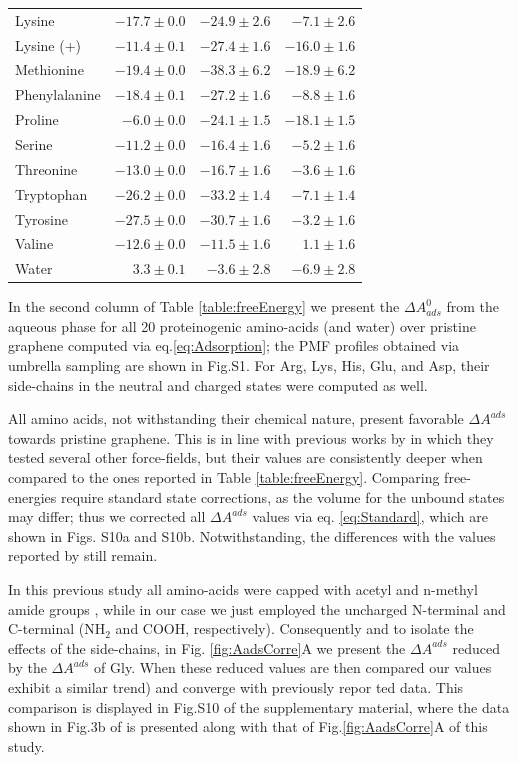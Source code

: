 \documentclass[journal=jcisd8,manuscript=article,layout=twocolumn]{achemso}
\begin{document}
\begin{table}[htbp!]
{\begin{tabular}{lrrr}
Lysine            & $-17.7 \pm 0.0$ & $-24.9 \pm 2.6$  & $-7.1  \pm 2.6$  \\
Lysine (+)        & $-11.4 \pm 0.1$ & $-27.4 \pm 1.6$  & $-16.0 \pm 1.6$  \\
Methionine        & $-19.4 \pm 0.0$ & $-38.3 \pm 6.2$  & $-18.9 \pm 6.2$  \\
Phenylalanine     & $-18.4 \pm 0.1$ & $-27.2 \pm 1.6$  & $-8.8  \pm 1.6$  \\
Proline           & $-6.0  \pm 0.0$ & $-24.1 \pm 1.5$  & $-18.1 \pm 1.5$  \\
Serine            & $-11.2 \pm 0.0$ & $-16.4 \pm 1.6$  & $-5.2  \pm 1.6$  \\
Threonine         & $-13.0 \pm 0.0$ & $-16.7 \pm 1.6$  & $-3.6  \pm 1.6$  \\
Tryptophan        & $-26.2 \pm 0.0$ & $-33.2 \pm 1.4$  & $-7.1  \pm 1.4$  \\
Tyrosine          & $-27.5 \pm 0.0$ & $-30.7 \pm 1.6$  & $-3.2  \pm 1.6$  \\
Valine            & $-12.6 \pm 0.0$ & $-11.5 \pm 1.6$  & $1.1   \pm 1.6$  \\
Water             & $3.3   \pm 0.1$ & $-3.6  \pm 2.8$  & $-6.9  \pm 2.8$  \\
\bottomrule
\end{tabular}
}
\end{table}

In the second column of Table \ref{table:freeEnergy} we present the $\Delta A_{ads}^0$ from the aqueous phase for all 20 proteinogenic amino-acids (and water) over pristine graphene computed via eq.\ref{eq:Adsorption}; the PMF profiles obtained via umbrella sampling are shown in Fig.S1. For Arg, Lys, His, Glu, and Asp, their side-chains in the neutral and charged states were computed as well.

All amino acids, not withstanding their chemical nature, present favorable $\Delta A^{ads}$ towards pristine graphene. This is in line with previous works by \citet{Dasetty2019} in which they tested several other force-fields, but their values are consistently deeper when compared to the ones reported in Table \ref{table:freeEnergy}.
Comparing free-energies require standard state corrections, as the volume for the unbound states may differ; thus  we corrected all $\Delta A^{ads}$ values  via eq. \eqref{eq:Standard}, which are shown in Figs. S10a and S10b. Notwithstanding, the differences with the values reported by \citet{Dasetty2019} still remain.

In this previous study all amino-acids were capped with acetyl and n-methyl amide groups \cite{Dasetty2019}, while in our case we just employed the uncharged N-terminal and C-terminal (NH$_2$ and COOH, respectively).
Consequently and to isolate the effects of the side-chains, in Fig. \ref{fig:AadsCorre}A we present the $\Delta A^{ads}$ reduced by the $\Delta A^{ads}$ of Gly.
When these reduced values are then compared our values exhibit a similar trend) and converge with previously repor ted data.\cite{Dasetty2019}
This comparison is displayed in Fig.S10 of the supplementary material, where the data shown in Fig.3b of \citet{Dasetty2019} is presented along with that of Fig.\ref{fig:AadsCorre}A of this study.
\end{document}
